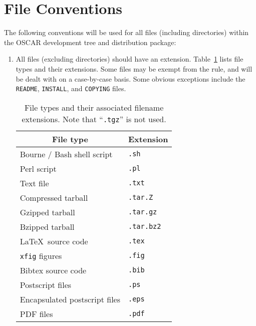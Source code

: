 %
%
%

\section{File Conventions}
\label{sec:file-conventions}

The following conventions will be used for all files (including
directories) within the OSCAR development tree and distribution
package:

\begin{enumerate}
  
\item All files (excluding directories) should have an extension.
  Table~\ref{tbl:files-exts} lists file types and their extensions.
  Some files may be exempt from the rule, and will be dealt with on a
  case-by-case basis.  Some obvious exceptions include the {\tt
    README}, {\tt INSTALL}, and {\tt COPYING} files.

  \begin{table}[tb]
    \begin{center}
      \begin{tabular}{|l|l|}
        \hline
        \multicolumn{1}{|c|}{{\bf File type}} & 
        \multicolumn{1}{c|}{{\bf Extension}} \\
        \hline
        Bourne / Bash shell script & {\tt .sh} \\
        Perl script & {\tt .pl} \\
        Text file & {\tt .txt} \\
        \hline
        Compressed tarball & {\tt .tar.Z} \\
        Gzipped tarball & {\tt .tar.gz} \\
        Bzipped tarball & {\tt .tar.bz2} \\
        \hline
        \LaTeX\ source code & {\tt .tex} \\
        {\tt xfig} figures & {\tt .fig} \\
        Bibtex source code & {\tt .bib} \\
        Postscript files & {\tt .ps} \\
        Encapsulated postscript files & {\tt .eps} \\
        PDF files & {\tt .pdf} \\
        \hline
      \end{tabular}
      \caption[File types and their associated filename 
        extensions.]{File types and their associated filename
        extensions.  Note that ``{\tt .tgz}'' is not used.}
      \label{tbl:files-exts}
    \end{center}
  \end{table}
  

\end{enumerate}
